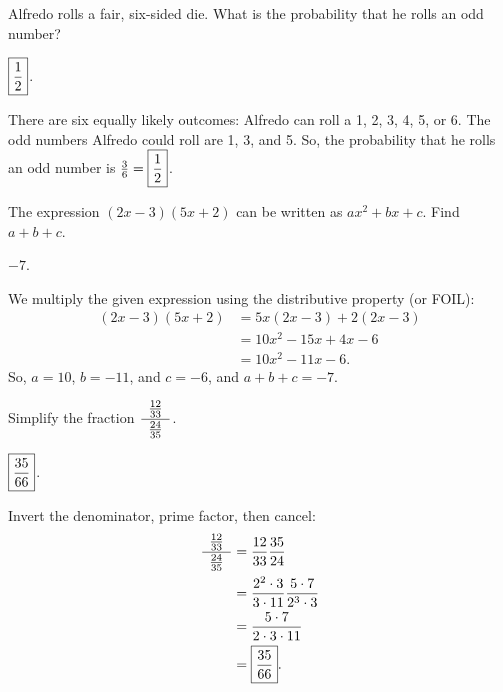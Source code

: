\documentclass[11pt]{article}
\DeclareRobustCommand{\frac}[3][0pt]{%
  {\begingroup\hspace{#1}#2\hspace{#1}\endgroup\over\hspace{#1}#3\hspace{#1}}}
\begin{document}

\begin{problem}
Alfredo rolls a fair, six-sided die. What is the probability that he rolls an odd number?
\end{problem}

\begin{answer} $\boxed{\frac{1}{2}}$. \end{answer}
\begin{solution}
There are six equally likely outcomes: Alfredo can roll a 1, 2, 3, 4, 5, or 6. The odd numbers Alfredo could roll are 1, 3, and 5. So, the probability that he rolls an odd number is $\frac{3}{6} = \boxed{\frac{1}{2}}$.
\end{solution}

\begin{problem}
The expression $(2x - 3)(5x + 2)$ can be written as $ax^2 + bx + c$. Find $a + b+ c$.
\end{problem}

\begin{answer} $\boxed{-7}$. \end{answer}
\begin{solution}
We multiply the given expression using the distributive property (or FOIL):
\begin{align*}
(2x - 3)(5x + 2) &= 5x(2x - 3) + 2(2x - 3) \\
&= 10x^2 - 15x + 4x - 6 \\
&= 10x^2 - 11x - 6.
\end{align*}
So, $a = 10$, $b = -11$, and $c = -6$, and $a + b + c = \boxed{-7}$.
\end{solution}

\begin{problem}
Simplify the fraction $\displaystyle \frac[5pt]{\frac{12}{33}} {\frac{24}{35}}$.
\end{problem}

\begin{answer} $\boxed{\frac{35}{66}}$. \end{answer}
\begin{solution}
Invert the denominator, prime factor, then cancel:
\begin{align*}
\frac[5pt]{\frac{12}{33}} {\frac{24}{35}} &= \frac{12}{33} \frac{35}{24} \\
&= \frac{2^2 \cdot 3}{3 \cdot 11} \frac{5 \cdot 7}{2^3 \cdot 3} \\
&= \frac{5 \cdot 7}{2 \cdot 3 \cdot 11} \\
&= \boxed{\frac{35}{66}}.
\end{align*}
\end{solution}
\end{document}
